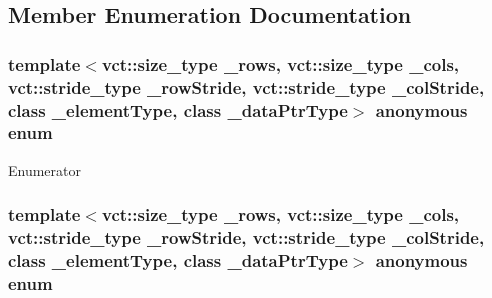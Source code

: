 \subsection{Member Enumeration Documentation}
\hypertarget{classvct_fixed_size_const_matrix_base_ab96748397b9d0700e8c892b7700c29b3}{\subsubsection[{anonymous enum}]{\setlength{\rightskip}{0pt plus 5cm}template$<$vct\-::size\-\_\-type \-\_\-rows, vct\-::size\-\_\-type \-\_\-cols, vct\-::stride\-\_\-type \-\_\-row\-Stride, vct\-::stride\-\_\-type \-\_\-col\-Stride, class \-\_\-element\-Type, class \-\_\-data\-Ptr\-Type$>$ anonymous enum}}\label{classvct_fixed_size_const_matrix_base_ab96748397b9d0700e8c892b7700c29b3}
\begin{Desc}
\item[Enumerator]\par
\begin{description}
\item[{\em 
\hypertarget{classvct_fixed_size_const_matrix_base_ab96748397b9d0700e8c892b7700c29b3a8f93683e9a4da14eb3a7005b19ad135f}{D\-I\-M\-E\-N\-S\-I\-O\-N}\label{classvct_fixed_size_const_matrix_base_ab96748397b9d0700e8c892b7700c29b3a8f93683e9a4da14eb3a7005b19ad135f}
}]\end{description}
\end{Desc}
\hypertarget{classvct_fixed_size_const_matrix_base_a05da4a844e1880e31d3052abb9a8063b}{\subsubsection[{anonymous enum}]{\setlength{\rightskip}{0pt plus 5cm}template$<$vct\-::size\-\_\-type \-\_\-rows, vct\-::size\-\_\-type \-\_\-cols, vct\-::stride\-\_\-type \-\_\-row\-Stride, vct\-::stride\-\_\-type \-\_\-col\-Stride, class \-\_\-element\-Type, class \-\_\-data\-Ptr\-Type$>$ anonymous enum}}\label{classvct_fixed_size_const_matrix_base_a05da4a844e1880e31d3052abb9a8063b}
